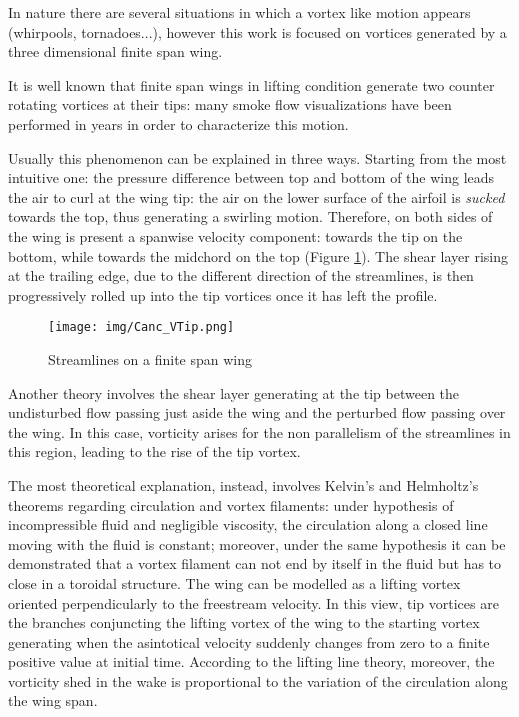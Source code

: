 In nature there are several situations in which a vortex like motion appears (whirpools, tornadoes...), however this work is focused on vortices generated by a three dimensional finite span wing. 

It is well known that finite span wings in lifting condition generate two counter rotating vortices at their tips: many smoke flow visualizations have been performed in years in order to characterize this motion. 


Usually this phenomenon can be explained in three ways. Starting from the most intuitive one: the pressure difference between top and bottom of the wing leads the air to curl at the wing tip: the air on the lower surface of the airfoil is \textit{sucked} towards the top, thus generating a swirling motion. Therefore, on both sides of the wing is present a spanwise velocity component: towards the tip on the bottom, while towards the midchord on the top (Figure \ref{Finite_Wing}). The shear layer rising at the trailing edge, due to the different direction of the streamlines, is then progressively rolled up into the tip vortices once it has left the profile. 

\begin{figure}
	\centering
	\texttt{[image: img/Canc\_VTip.png]}
	\caption{Streamlines on a finite span wing}
	\label{Finite_Wing}
\end{figure}

Another theory involves the shear layer generating at the tip between the undisturbed flow passing just aside the wing and the perturbed flow passing over the wing. In this case, vorticity arises for the non parallelism of the streamlines in this region, leading to the rise of the tip vortex. 

The most theoretical explanation, instead, involves Kelvin's and Helmholtz's theorems regarding circulation and vortex filaments: under hypothesis of incompressible fluid and negligible viscosity, the circulation along a closed line moving with the fluid is constant; moreover, under the same hypothesis it can be demonstrated that a vortex filament can not end by itself in the fluid but has to close in a toroidal structure. The wing can be modelled as a lifting vortex oriented perpendicularly to the freestream velocity. In this view, tip vortices are the branches conjuncting the lifting vortex of the wing to the starting vortex generating when the asintotical velocity suddenly changes from zero to a finite positive value at initial time. According to the lifting line theory, moreover, the vorticity shed in the wake is proportional to the variation of the circulation along the wing span.

